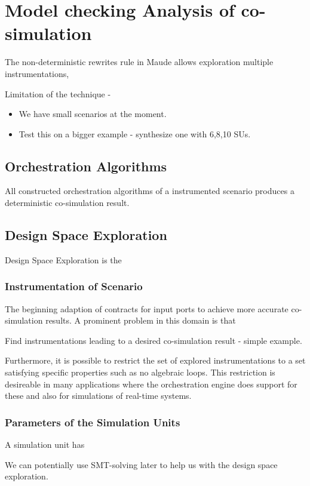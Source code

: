 \section{Model checking Analysis of co-simulation}
The non-deterministic rewrites rule in Maude allows exploration multiple instrumentations, 

Limitation of the technique -
\begin{itemize}
    \item We have small scenarios at the moment.
    \item Test this on a bigger example - synthesize one with 6,8,10 SUs.
\end{itemize}


\subsection{Orchestration Algorithms}
All constructed orchestration algorithms of a instrumented scenario produces a deterministic co-simulation result.




\subsection{Design Space Exploration}
Design Space Exploration is the 

\subsubsection{Instrumentation of Scenario}
The beginning adaption of contracts for input ports to achieve more accurate co-simulation results. 
A prominent problem in this domain is that   

Find instrumentations leading to a desired co-simulation result - simple example. 

Furthermore, it is possible to restrict the set of explored instrumentations to a set satisfying specific properties such as no algebraic loops.
This restriction is desireable in many applications where the orchestration engine does support for these and also for simulations of real-time systems.

\subsubsection{Parameters of the Simulation Units}
A simulation unit has 



We can potentially use SMT-solving later to help us with the design space exploration.
